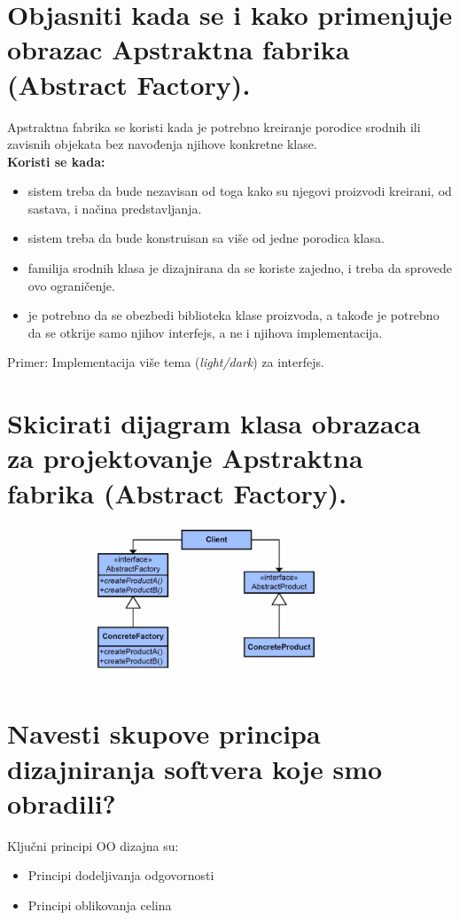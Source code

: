 \documentclass[a4paper]{article}
\begin{document}
\section{Objasniti kada se i kako primenjuje obrazac Apstraktna fabrika (Abstract Factory).}
  Apstraktna fabrika se koristi kada je potrebno kreiranje porodice srodnih ili zavisnih objekata
  bez navođenja njihove konkretne klase. \\
  \textbf{Koristi se kada:}
  \begin{itemize}
    \item sistem treba da bude nezavisan od toga kako su njegovi proizvodi kreirani, 
          od sastava, i načina predstavljanja.
    \item sistem treba da bude konstruisan sa više od jedne porodica klasa.
    \item familija srodnih klasa je dizajnirana da se koriste zajedno, 
          i treba da sprovede ovo ograničenje.
    \item je potrebno da se obezbedi biblioteka klase proizvoda, 
          a takođe je potrebno da se otkrije samo njihov interfejs, 
          a ne i njihova implementacija.
  \end{itemize}

  Primer: Implementacija više tema (\textit{light/dark}) za interfejs. \cite{medium_abstractfactory}

\section{Skicirati dijagram klasa obrazaca za projektovanje Apstraktna fabrika (Abstract Factory).}
  \begin{figure}[H]
    \begin{center}
        \includegraphics[width=100mm,height=45mm]{Slike/dp_abstract_factory.png}
    \end{center}
  \end{figure} 


\section{Navesti skupove principa dizajniranja softvera koje smo obradili?}
  Ključni principi OO dizajna su:
  \begin{itemize}
    \item Principi dodeljivanja odgovornosti
    \item Principi oblikovanja celina
  \end{itemize}
\end{document}
